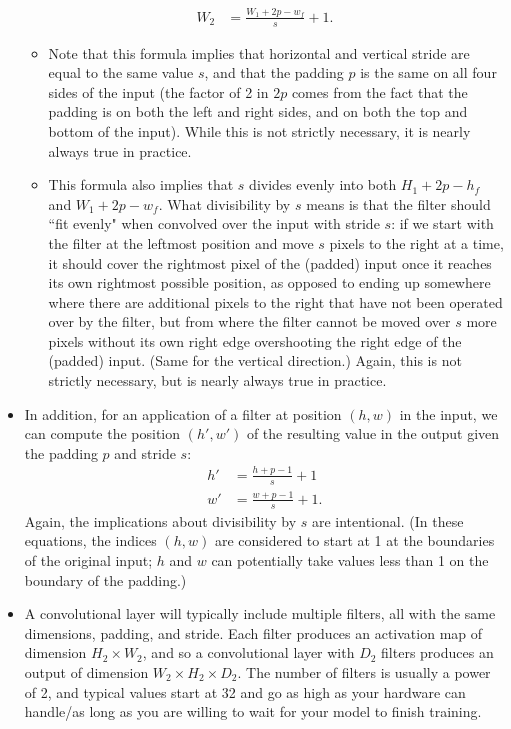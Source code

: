 \begin{itemize}
\begin{align*}
            W_2 &= \frac{W_1 + 2p - w_f}{s} + 1.
        \end{align*}
        \begin{itemize}
            \item Note that this formula implies that horizontal and vertical stride are equal to the same value $s$, and that the padding $p$ is the same on all four sides of the input (the factor of 2 in $2p$ comes from the fact that the padding is on both the left and right sides, and on both the top and bottom of the input). While this is not strictly necessary, it is nearly always true in practice.
            \item This formula also implies that $s$ divides evenly into both $H_1 + 2p - h_f$ and $W_1 + 2p - w_f$. What divisibility by $s$ means is that the filter should ``fit evenly" when convolved over the input with stride $s$: if we start with the filter at the leftmost position and move $s$ pixels to the right at a time, it should cover the rightmost pixel of the (padded) input once it reaches its own rightmost possible position, as opposed to ending up somewhere where there are additional pixels to the right that have not been operated over by the filter, but from where the filter cannot be moved over $s$ more pixels without its own right edge overshooting the right edge of the (padded) input. (Same for the vertical direction.) Again, this is not strictly necessary, but is nearly always true in practice.
        \end{itemize}
    \item In addition, for an application of a filter at position $(h, w)$ in the input, we can compute the position $(h', w')$ of the resulting value in the output given the padding $p$ and stride $s$:
        \begin{align*}
            h' &= \frac{h + p - 1}{s} + 1\\
            w' &= \frac{w + p - 1}{s} + 1.
        \end{align*}
        Again, the implications about divisibility by $s$ are intentional. (In these equations, the indices $(h, w)$ are considered to start at 1 at the boundaries of the original input; $h$ and $w$ can potentially take values less than 1 on the boundary of the padding.)
    \item A convolutional layer will typically include multiple filters, all with the same dimensions, padding, and stride. Each filter produces an activation map of dimension $H_2 \times W_2$, and so a convolutional layer with $D_2$ filters produces an output of dimension $W_2 \times H_2 \times D_2$. The number of filters is usually a power of 2, and typical values start at 32 and go as high as your hardware can handle/as long as you are willing to wait for your model to finish training.
\end{itemize}

